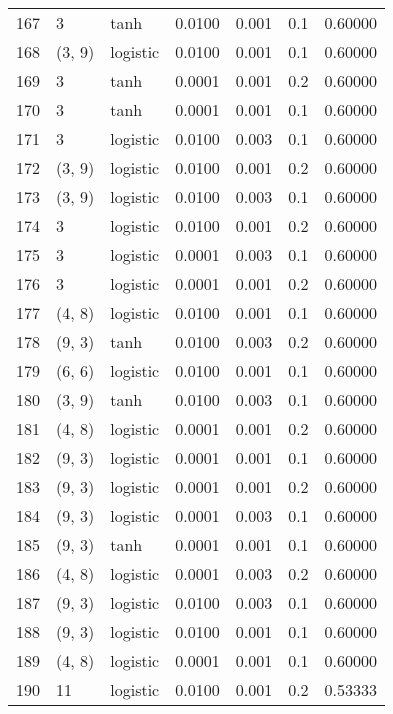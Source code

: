\begin{tabular}{lllrrrr}
167 &           3 &      tanh &  0.0100 &  0.001 &  0.1 &   0.60000 \\
168 &      (3, 9) &  logistic &  0.0100 &  0.001 &  0.1 &   0.60000 \\
169 &           3 &      tanh &  0.0001 &  0.001 &  0.2 &   0.60000 \\
170 &           3 &      tanh &  0.0001 &  0.001 &  0.1 &   0.60000 \\
171 &           3 &  logistic &  0.0100 &  0.003 &  0.1 &   0.60000 \\
172 &      (3, 9) &  logistic &  0.0100 &  0.001 &  0.2 &   0.60000 \\
173 &      (3, 9) &  logistic &  0.0100 &  0.003 &  0.1 &   0.60000 \\
174 &           3 &  logistic &  0.0100 &  0.001 &  0.2 &   0.60000 \\
175 &           3 &  logistic &  0.0001 &  0.003 &  0.1 &   0.60000 \\
176 &           3 &  logistic &  0.0001 &  0.001 &  0.2 &   0.60000 \\
177 &      (4, 8) &  logistic &  0.0100 &  0.001 &  0.1 &   0.60000 \\
178 &      (9, 3) &      tanh &  0.0100 &  0.003 &  0.2 &   0.60000 \\
179 &      (6, 6) &  logistic &  0.0100 &  0.001 &  0.1 &   0.60000 \\
180 &      (3, 9) &      tanh &  0.0100 &  0.003 &  0.1 &   0.60000 \\
181 &      (4, 8) &  logistic &  0.0001 &  0.001 &  0.2 &   0.60000 \\
182 &      (9, 3) &  logistic &  0.0001 &  0.001 &  0.1 &   0.60000 \\
183 &      (9, 3) &  logistic &  0.0001 &  0.001 &  0.2 &   0.60000 \\
184 &      (9, 3) &  logistic &  0.0001 &  0.003 &  0.1 &   0.60000 \\
185 &      (9, 3) &      tanh &  0.0001 &  0.001 &  0.1 &   0.60000 \\
186 &      (4, 8) &  logistic &  0.0001 &  0.003 &  0.2 &   0.60000 \\
187 &      (9, 3) &  logistic &  0.0100 &  0.003 &  0.1 &   0.60000 \\
188 &      (9, 3) &  logistic &  0.0100 &  0.001 &  0.1 &   0.60000 \\
189 &      (4, 8) &  logistic &  0.0001 &  0.001 &  0.1 &   0.60000 \\
190 &          11 &  logistic &  0.0100 &  0.001 &  0.2 &   0.53333 \\

\end{tabular}

